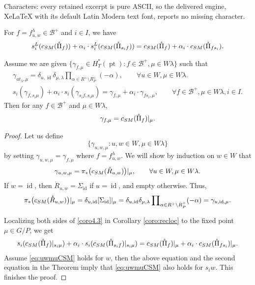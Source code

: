 \documentclass[10pt,a4paper]{amsart}
\def\CSM{c_{\rm SM}}
\def\id{\operatorname{id}}
\def\pt{\operatorname{pt}}
\begin{document}
Characters: every retained excerpt is pure ASCII, so the delivered engine, XeLaTeX with its default Latin Modern text font, reports no missing character.
\begin{Coro}\label{coro:recloc}
For $f=f^\lambda_{u,w}\in \mathcal{B}^+$ and $i\in I$, we have
\begin{align}\label{coro4.3}
s_i^L(\CSM(\mathring{\Pi}_{f}))
+ \alpha_i\cdot s_i^L(\CSM(\mathring{\Pi}_{s_if}))
= \CSM(\mathring{\Pi}_{f})
+ \alpha_i\cdot\CSM(\mathring{\Pi}_{fs_i}).
\end{align}
\end{Coro}

\begin{Th}\label{themorem4.1}
Assume we are given 
$\{\gamma_{f,\mu}\in H_T^*(\pt): f\in \mathcal{B}^+,\mu\in W\lambda\}$
such that 
\begin{gather*}
\label{eq:CSMPRchar1}
\gamma_{ut_\lambda,\mu}=\delta_{u,\id}\delta_{\mu,\lambda}
\prod\nolimits_{\alpha\in R^+\setminus R_P^+}(-\alpha),
\qquad \forall u\in W,\mu\in W\lambda.
\\
\label{eq:CSMPRchar2}
s_i(\gamma_{f,s_i\mu})
+\alpha_i\cdot s_i(\gamma_{s_if,s_i\mu})
= \gamma_{f,\mu}
+\alpha_i\cdot \gamma_{fs_i,\mu},
\qquad \forall f\in \mathcal{B}^+,\mu\in W\lambda, i\in I.
\end{gather*}
Then for any $f\in \mathcal{B}^+$ and $\mu\in W\lambda$,
$$\gamma_{f,\mu}=\CSM(\mathring{\Pi}_f)|_\mu.$$
\end{Th}

\begin{proof}
Let us define
$$\{\gamma_{u,w,\mu}:u,w\in W,\mu\in W\lambda\}$$
by setting $\gamma_{u,w,\mu}= \gamma_{f,\mu}$ where $f=f^\lambda_{u,w}$. 
We will show by induction on $w\in W$ that 
\begin{equation}\label{eq:uwmuCSM}
\gamma_{u,w,\mu}=\pi_*\big(\CSM(\mathring{R}_{u,w})\big)|_{\mu},
\qquad \forall u\in W,\mu\in W\lambda.
\end{equation}
If $w=\id$, then $\mathring{R}_{u,w}=\Sigma_{\id}$ if $u=\id$, and empty otherwise. Thus, 
\[\pi_*\big(\CSM(\mathring{R}_{u,w})\big)|_{\mu}=\delta_{u,\id}[\Sigma_{\id}]|_{\mu}=\delta_{u,\id}\delta_{\mu,\lambda}
\prod\nolimits_{\alpha\in R^+\setminus R_P^+}(-\alpha)=\gamma_{u,\id,\mu}.\]

Localizing both sides of \eqref{coro4.3} in Corollary \ref{coro:recloc} to the fixed point $\mu\in G/P$, we get
$$
s_i(\CSM(\mathring{\Pi}_f)|_{s_i\mu})
+\alpha_i\cdot s_i(\CSM(\mathring{\Pi}_{s_if})|_{s_i\mu})
= \CSM(\mathring{\Pi}_f)|_{\mu}
+\alpha_i\cdot \CSM(\mathring{\Pi}_{fs_i})|_{\mu}. 
$$
Assume  \eqref{eq:uwmuCSM} holds for $w$, then the above equation and the second equation in the Theorem imply that  \eqref{eq:uwmuCSM} also holds for $s_iw$. This finishes the proof.
\end{proof}
\end{document}
